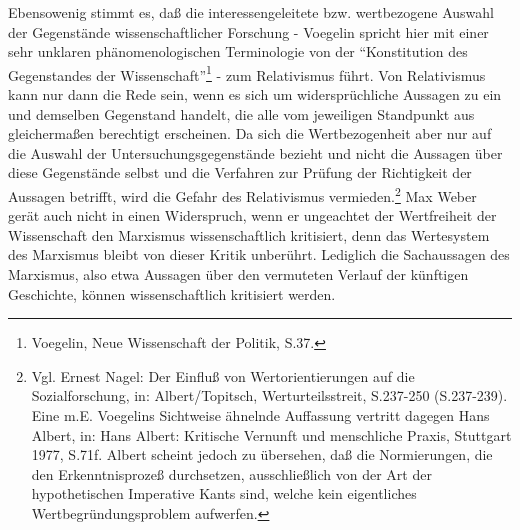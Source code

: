 Ebensowenig stimmt es, daß die interessengeleitete bzw. wertbezogene Auswahl
der Gegenstände wissenschaftlicher Forschung - Voegelin spricht hier mit einer
sehr unklaren phänomenologischen Terminologie von der "`Konstitution des
Gegenstandes der Wissenschaft"'\footnote{Voegelin, Neue Wissenschaft der
  Politik, S.37.} - zum Relativismus führt. Von Relativismus kann nur dann die
Rede sein, wenn es sich um widersprüchliche Aussagen zu ein und demselben
Gegenstand handelt, die alle vom jeweiligen Standpunkt aus gleichermaßen
berechtigt erscheinen. Da sich die Wertbezogenheit aber nur auf die Auswahl
der Untersuchungsgegenstände bezieht und nicht die Aussagen über diese
Gegenstände selbst und die Verfahren zur Prüfung der Richtigkeit der Aussagen
betrifft, wird die Gefahr des Relativismus vermieden.\footnote{Vgl. Ernest
  Nagel: Der Einfluß von Wertorientierungen auf die Sozialforschung, in:
  Albert/Topitsch, Werturteilsstreit, S.237-250 (S.237-239). Eine m.E.
  Voegelins Sichtweise ähnelnde Auf\/fassung vertritt dagegen Hans Albert, in:
  Hans Albert: Kritische Vernunft und menschliche Praxis, Stuttgart 1977,
  S.71f. Albert scheint jedoch zu übersehen, daß die Normierungen, die den
  Erkenntnisprozeß durchsetzen, ausschließlich von der Art der hypothetischen
  Imperative Kants sind, welche kein eigentliches Wertbegründungsproblem
  aufwerfen.} Max Weber gerät auch nicht in einen Widerspruch, wenn er
ungeachtet der Wertfreiheit der Wissenschaft den Marxismus wissenschaftlich
kritisiert, denn das Wertesystem des Marxismus bleibt von dieser Kritik
unberührt. Lediglich die Sachaussagen des Marxismus, also etwa Aussagen über
den vermuteten Verlauf der künftigen Geschichte, können wissenschaftlich
kritisiert werden.

